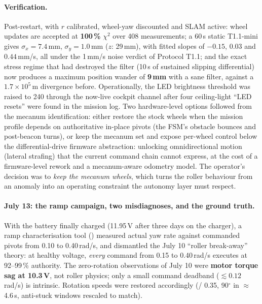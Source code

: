 \paragraph{Verification.} Post-restart, with $r$ calibrated, wheel-yaw
discounted and SLAM active: wheel updates are accepted at \textbf{100\,\%}
$\chi^2$ over 408 measurements; a 60\,s static T1.1-mini gives
$\sigma_x = 7.4$\,mm, $\sigma_y = 1.0$\,mm ($z$: 29\,mm), with fitted
slopes of $-0.15$, $0.03$ and $0.44$\,mm/s, all under the 1\,mm/s noise
verdict of Protocol T1.1; and the exact stress regime that had destroyed the
filter (10\,s of sustained slipping differential) now produces a maximum
position wander of \textbf{9\,mm} with a sane filter, against a
$1.7 \times 10^5$\,m divergence before. Operationally, the LED brightness
threshold was raised to 240 through the now-live cockpit channel after four
ceiling-light ``LED resets'' were found in the mission log. Two hardware-level options followed from the mecanum identification:
either restore the stock wheels when the mission profile depends on
authoritative in-place pivots (the FSM's obstacle bounces and post-beacon
turns), or keep the mecanum set and expose per-wheel control below the
differential-drive firmware abstraction: unlocking omnidirectional
motion (lateral strafing) that the current command chain cannot express,
at the cost of a firmware-level rework and a mecanum-aware odometry model.
The operator's decision was to \emph{keep the mecanum wheels}, which turns
the roller behaviour from an anomaly into an operating constraint the
autonomy layer must respect.

\paragraph{July 13: the ramp campaign, two misdiagnoses, and the
ground truth.} With the battery finally charged (11.95\,V after three days
on the charger), a ramp characterisation tool ()
measured actual yaw rate against commanded pivots from 0.10 to
0.40\,rad/s, and dismantled the July 10 ``roller break-away'' theory:
at healthy voltage, \emph{every} command from 0.15 to 0.40\,rad/s executes
at 92--99\,\% authority. The zero-rotation observations of July 10 were
\textbf{motor torque sag at 10.3\,V}, not roller physics; only a small
command deadband ($\lesssim 0.12$\,rad/s) is intrinsic. Rotation speeds
were restored accordingly (/ 0.35,
90$^\circ$ in $\approx$4.6\,s, anti-stuck windows rescaled to match).

